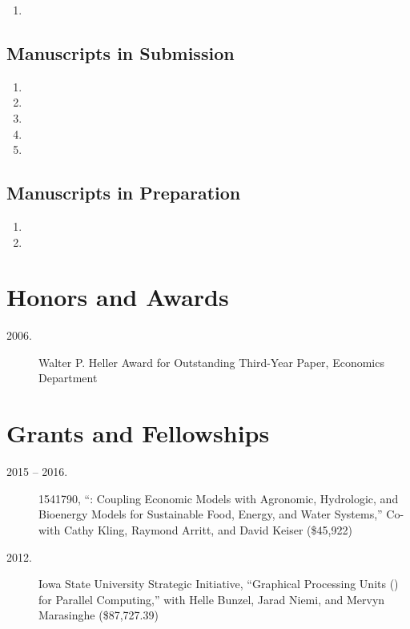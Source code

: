 \documentclass[12pt]{article}%
\newcommand{\allcaps}[1]{\textls{\MakeUppercase{#1}}}
\begin{document}
\begin{enumerate}
\item {}
\end{enumerate}

\subsection*{Manuscripts in Submission}

\begin{enumerate}
\item {}
\item {}
\item {}
\item {}
\item {}
\end{enumerate}

\subsection*{Manuscripts in Preparation}
\begin{enumerate}
\item {}
\item {}
\end{enumerate}

\section*{Honors and Awards}

\begin{description}
\item[2006.] Walter P. Heller Award for Outstanding Third-Year Paper,
\allcaps{UCSD} Economics Department
\end{description}

\section*{Grants and Fellowships}

\begin{description}
\item[2015 -- 2016.] \allcaps{NSF} 1541790, ``\allcaps{FEW}: Coupling
  Economic Models with Agronomic, Hydrologic, and Bioenergy Models for
  Sustainable Food, Energy, and Water Systems,'' Co-\allcaps{PI} with
  Cathy Kling, Raymond Arritt, and David Keiser (\$45,922)
\item[2012.] Iowa State University Strategic Initiative, ``Graphical
  Processing Units (\allcaps{GPU}) for Parallel Computing,'' with
  Helle Bunzel, Jarad Niemi, and Mervyn Marasinghe (\$87,727.39)
\end{description}
\end{document}
